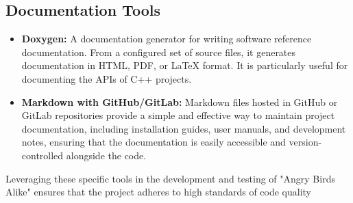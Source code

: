 \documentclass[12pt]{article}
\begin{document}
\subsection{Documentation Tools}
\begin{itemize}
    \item \textbf{Doxygen:} A documentation generator for writing software reference documentation. From a configured set of source files, it generates documentation in HTML, PDF, or LaTeX format. It is particularly useful for documenting the APIs of C++ projects.
    \item \textbf{Markdown with GitHub/GitLab:} Markdown files hosted in GitHub or GitLab repositories provide a simple and effective way to maintain project documentation, including installation guides, user manuals, and development notes, ensuring that the documentation is easily accessible and version-controlled alongside the code.
\end{itemize}

Leveraging these specific tools in the development and testing of "Angry Birds Alike" ensures that the project adheres to high standards of code quality
\end{document}
